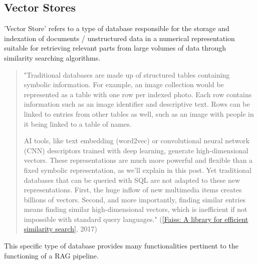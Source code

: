 \subsection{Vector Stores}
'Vector Store' refers to a type of database responsible for the storage and indexation of documents / unstructured data in a numerical representation suitable for retrieving relevant parts from large volumes of data through similarity searching algorithms.
\begin{quote}
    "Traditional databases are made up of structured tables containing symbolic information. For example, an image collection would be represented as a table with one row per indexed photo. Each row contains information such as an image identifier and descriptive text. Rows can be linked to entries from other tables as well, such as an image with people in it being linked to a table of names.

    AI tools, like text embedding (word2vec) or convolutional neural network (CNN) descriptors trained with deep learning, generate high-dimensional vectors. These representations are much more powerful and flexible than a fixed symbolic representation, as we’ll explain in this post. Yet traditional databases that can be queried with SQL are not adapted to these new representations. First, the huge inflow of new multimedia items creates billions of vectors. Second, and more importantly, finding similar entries means finding similar high-dimensional vectors, which is inefficient if not impossible with standard query languages."  (\href{https://engineering.fb.com/2017/03/29/data-infrastructure/faiss-a-library-for-efficient-similarity-search/}{[Faiss: A library for efficient similarity search]}, 2017)
\end{quote}
This specific type of database provides many functionalities pertinent to the functioning of a RAG pipeline.

